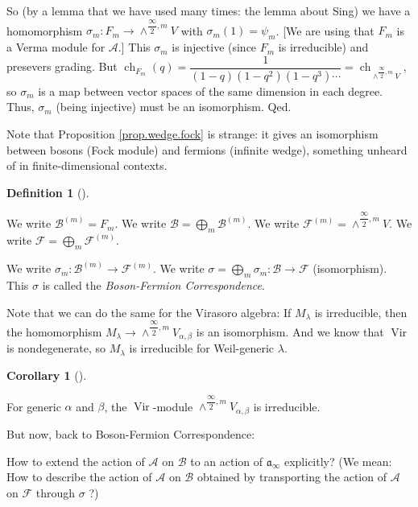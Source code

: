 \documentclass
[numbers=enddot,12pt,final,onecolumn,german,notitlepage]{scrartcl}%
\theoremstyle{definition}
\newtheorem{defi}[theo]{Definition}
\newenvironment{definition}[1][]
{\begin{defi}[#1]\begin{leftbar}}
{\end{leftbar}\end{defi}}
\newtheorem{coro}[theo]{Corollary}
\newenvironment{corollary}[1][]
{\begin{coro}[#1]\begin{leftbar}}
{\end{leftbar}\end{coro}}
\begin{document}
So (by a lemma that we have used many times: the lemma about Sing) we have a
homomorphism $\sigma_{m}:F_{m}\rightarrow\wedge^{\dfrac{\infty}{2},m}V$ with
$\sigma_{m}\left(  1\right)  =\psi_{m}$. [We are using that $F_{m}$ is a Verma
module for $\mathcal{A}$.] This $\sigma_{m}$ is injective (since $F_{m}$ is
irreducible) and presevers grading. But $\operatorname*{ch}\nolimits_{F_{m}%
}\left(  q\right)  =\dfrac{1}{\left(  1-q\right)  \left(  1-q^{2}\right)
\left(  1-q^{3}\right)  \cdots}=\operatorname*{ch}\nolimits_{\wedge
^{\dfrac{\infty}{2},m}V}$, so $\sigma_{m}$ is a map between vector spaces of
the same dimension in each degree. Thus, $\sigma_{m}$ (being injective) must
be an isomorphism. Qed.

Note that Proposition \ref{prop.wedge.fock} is strange: it gives an
isomorphism between bosons (Fock module) and fermions (infinite wedge),
something unheard of in finite-dimensional contexts.

\begin{definition}
We write $\mathcal{B}^{\left(  m\right)  }=F_{m}$. We write $\mathcal{B}%
=\bigoplus\limits_{m}\mathcal{B}^{\left(  m\right)  }$. We write
$\mathcal{F}^{\left(  m\right)  }=\wedge^{\dfrac{\infty}{2},m}V$. We write
$\mathcal{F}=\bigoplus\limits_{m}\mathcal{F}^{\left(  m\right)  }$.

We write $\sigma_{m}:\mathcal{B}^{\left(  m\right)  }\rightarrow
\mathcal{F}^{\left(  m\right)  }$. We write $\sigma=\bigoplus\limits_{m}%
\mathcal{\sigma}_{m}:\mathcal{B}\rightarrow\mathcal{F}$ (isomorphism). This
$\sigma$ is called the \textit{Boson-Fermion Correspondence}.
\end{definition}

Note that we can do the same for the Virasoro algebra: If $M_{\lambda}$ is
irreducible, then the homomorphism $M_{\lambda}\rightarrow\wedge
^{\dfrac{\infty}{2},m}V_{\alpha,\beta}$ is an isomorphism. And we know that
$\operatorname*{Vir}$ is nondegenerate, so $M_{\lambda}$ is irreducible for
Weil-generic $\lambda$.

\begin{corollary}
For generic $\alpha$ and $\beta$, the $\operatorname*{Vir}$-module
$\wedge^{\dfrac{\infty}{2},m}V_{\alpha,\beta}$ is irreducible.
\end{corollary}

But now, back to Boson-Fermion Correspondence:

How to extend the action of $\mathcal{A}$ on $\mathcal{B}$ to an action of
$\mathfrak{a}_{\infty}$ explicitly? (We mean: How to describe the action of
$\mathcal{A}$ on $\mathcal{B}$ obtained by transporting the action of
$\mathcal{A}$ on $\mathcal{F}$ through $\sigma$ ?)
\end{document}
